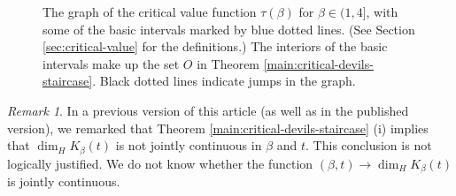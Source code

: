 \documentclass[12pt]{amsart}
\theoremstyle{definition}
\theoremstyle{remark}
\newtheorem{remark}[theorem]{Remark}
\numberwithin{equation}{section}
\begin{document}
\begin{figure}[h!]
\begin{center}
\end{center}
\caption{The graph of the critical value function {$\tau(\beta)$ for} $\beta\in(1,4]$, with some of the basic intervals marked by blue dotted lines. (See Section \ref{sec:critical-value} for the definitions.) The interiors of the basic intervals make up the set $O$ in Theorem \ref{main:critical-devils-staircase}. Black dotted lines indicate jumps in the graph.}
\label{fig:graph-tau-more}
\end{figure}

\begin{remark}
In a previous version of this article (as well as in the published version), we remarked that Theorem \ref{main:critical-devils-staircase} (i) implies that $\dim_H K_\beta(t)$ is not jointly continuous in $\beta$ and $t$. This conclusion is not logically justified. We do not know whether the function $(\beta,t)\to \dim_H K_\beta(t)$ is jointly continuous.
\end{remark}

\end{document}
